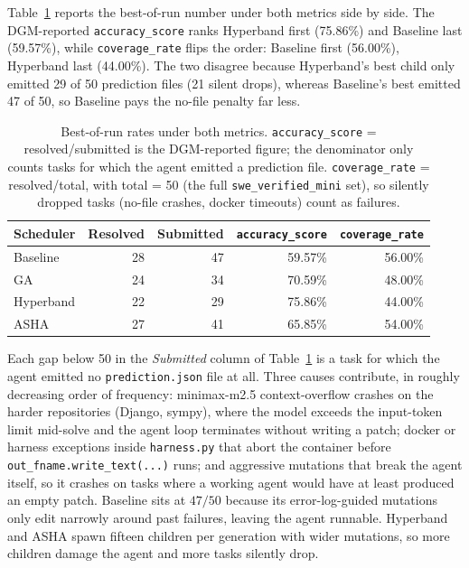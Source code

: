 Table~\ref{tab:results-coverage} reports the best-of-run number
under both metrics side by side. The DGM-reported
\texttt{accuracy\_score} ranks Hyperband first (75.86\%) and Baseline
last (59.57\%), while \texttt{coverage\_rate} flips the order:
Baseline first (56.00\%), Hyperband last (44.00\%). The two
disagree because Hyperband's best child only emitted 29 of 50
prediction files (21 silent drops), whereas Baseline's best emitted
47 of 50, so Baseline pays the no-file penalty far less.

\begin{table}[ht]
\centering
\caption{Best-of-run rates under both metrics.
\texttt{accuracy\_score} = resolved/submitted is the DGM-reported
figure; the denominator only counts tasks for which the agent emitted
a prediction file. \texttt{coverage\_rate} = resolved/total, with
total = 50 (the full \texttt{swe\_verified\_mini} set), so silently
dropped tasks (no-file crashes, docker timeouts) count as failures.}
\label{tab:results-coverage}
\setlength{\tabcolsep}{4pt}
\begin{tabular}{lrrrr}
\hline
Scheduler & Resolved & Submitted &
\texttt{accuracy\_score} & \texttt{coverage\_rate} \\
\hline
Baseline  & 28 & 47 & 59.57\% & 56.00\% \\
GA        & 24 & 34 & 70.59\% & 48.00\% \\
Hyperband & 22 & 29 & 75.86\% & 44.00\% \\
ASHA      & 27 & 41 & 65.85\% & 54.00\% \\
\hline
\end{tabular}
\end{table}

Each gap below 50 in the \emph{Submitted} column of
Table~\ref{tab:results-coverage} is a task for which the agent emitted
no \texttt{prediction.json} file at all. Three causes contribute, in
roughly decreasing order of frequency: minimax-m2.5 context-overflow
crashes on the harder repositories (Django, sympy), where the model
exceeds the input-token limit mid-solve and the agent loop terminates
without writing a patch; docker or harness exceptions inside
\texttt{harness.py} that abort the container before
\texttt{out\bk\_fname.write\bk\_text(...)} runs; and aggressive
mutations that break the agent itself, so it crashes on tasks where a
working agent would have at least produced an empty patch. Baseline
sits at $47/50$ because its error-log-guided mutations only edit
narrowly around past failures, leaving the agent runnable. Hyperband
and ASHA spawn fifteen children per generation with wider mutations,
so more children damage the agent and more tasks silently drop.

